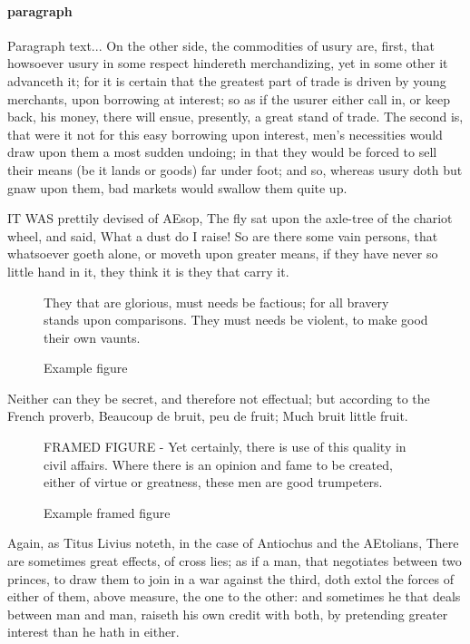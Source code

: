 \documentclass[a4paper, 12pt]{memoir}
\begin{document}
\paragraph*{paragraph} 
Paragraph text... On the other side, the commodities of usury are, first, that howsoever usury in some respect hindereth merchandizing, yet in some other it advanceth it; for it is certain that the greatest part of trade is driven by young merchants, upon borrowing at interest; so as if the usurer either call in, or keep back, his money, there will ensue, presently, a great stand of trade. The second is, that were it not for this easy borrowing upon interest, men's necessities would draw upon them a most sudden undoing; in that they would be forced to sell their means (be it lands or goods) far under foot; and so, whereas usury doth but gnaw upon them, bad markets would swallow them quite up.

IT WAS prettily devised of AEsop, The fly sat upon the axle-tree of the chariot wheel, and said, What a dust do I raise! So are there some vain persons, that whatsoever goeth alone, or moveth upon greater means, if they have never so little hand in it, they think it is they that carry it. 

\begin{figure}
\centering

 They that are glorious, must needs be factious; for all bravery stands upon comparisons. They must needs be violent, to make good their own vaunts.

\caption{Example figure}\label{fig:noframe}
\end{figure}

 Neither can they be secret, and therefore not effectual; but according to the French proverb, Beaucoup de bruit, peu de fruit; Much bruit little fruit.


\begin{figure}
\centering
\begin{framed}\centering
FRAMED FIGURE - Yet certainly, there is use of this quality in civil affairs. Where there is an opinion and fame to be created, either of virtue or greatness, these men are good trumpeters.
\end{framed}
\caption{Example framed figure}\label{fig:framed}
\end{figure}

Again, as Titus Livius noteth, in the case of Antiochus and the AEtolians, There are sometimes great effects, of cross lies; as if a man, that negotiates between two princes, to draw them to join in a war against the third, doth extol the forces of either of them, above measure, the one to the other: and sometimes he that deals between man and man, raiseth his own credit with both, by pretending greater interest than he hath in either.
\end{document}
